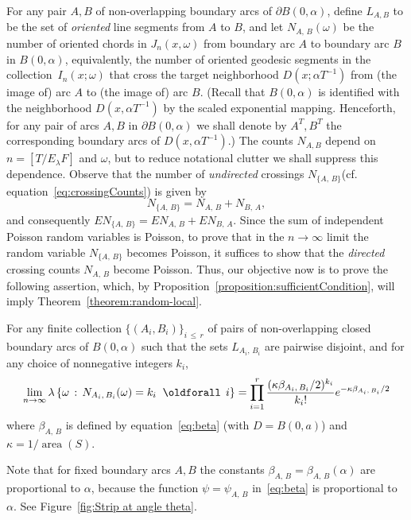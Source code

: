\documentclass[10pt]{amsart}
\theoremstyle{definition}\newtheorem{defi}[theo]{Definition}\newtheorem{rema}[theo]{Remark}\newtheorem{exam}[theo]{Example}\newtheorem{exem}[theo]{Example}\newtheorem{nota}[theo]{Notation}
\DeclareMathOperator{\area}{area}
\renewcommand*{\forall}{\mathrel{\oldforall}}
\begin{document}
For any pair $A,B$ of non-overlapping boundary arcs of $\partial B (0,\alpha)$, define $L_{A,B}$ to be the set of
\emph{oriented} line segments from $A$ to $B$, and let $N_{A,\,B} (\omega)$ be the number of oriented chords in $J_{n} (x,\omega)$ from boundary arc $A$ to boundary arc $B$ in $B(0,\alpha)$, equivalently, the number of oriented geodesic segments in the collection~$I_{n} (x;\omega)$ that cross the target neighborhood $D(x;\alpha T^{-1})$ from (the image of) arc $A$ to (the image of) arc $B$. (Recall that $B (0,\alpha)$ is identified with the neighborhood $D(x,\alpha T^{-1})$ by the scaled exponential mapping. Henceforth, for any pair of arcs $A,B$ in $\partial B(0, \alpha)$ we shall denote by $A^{T},B^{T}$ the corresponding boundary arcs of $D(x,\alpha T^{-1})$.) The counts $N_{A,B}$ depend on $n=[T/E_{\lambda}F]$ and $\omega$, but to reduce notational clutter we shall suppress this dependence. Observe that the number of \emph{undirected} crossings $N_{\{A,\,B \}}$(cf. equation~\eqref{eq:crossingCounts}) is given by
\[
N_{\{A,\,B \}}=N_{A,\,B}+N_{B,\,A},
\]
and consequently $EN_{\{A,\,B \}}=EN_{A,\,B}+EN_{B,\,A}$. Since the sum of independent Poisson random variables is Poisson, to prove that in the $n \rightarrow \infty$ limit the random variable $N_{\{A,\,B\}}$ becomes Poisson, it suffices to show that the \emph{directed} crossing counts $N_{A,\,B}$ become Poisson. Thus, our objective now is to prove the following assertion, which, by Proposition~\ref{proposition:sufficientCondition}, will imply Theorem~\ref{theorem:random-local}.

\begin{prop}\label{proposition:reformulation}
For any finite collection $\{(A_{i},B_{i}) \}_{i\,\leq \,r}$ of pairs of non-overlapping closed boundary arcs of $B (0,\alpha)$ such that the sets $L_{A_{i},\,B_{i}}$ are pairwise disjoint, and for any choice of nonnegative integers $k_{i}$,
\begin{equation}\label{eq:reformulation}
\lim_{n \rightarrow \infty} \lambda \left\{\omega \,:\, N_{A_{i},\,B_{i}} (\omega)=k_{i} \; \forall \,i \right\} =\prod_{i=1}^{r} \frac{(\kappa
\beta_{A_{i},\,B_{i}}/2)^{k_{i}}}{k_{i}!} e^{- \kappa \beta_{A_{i},\,B_{i}}/2}
\end{equation}
where $\beta_{A,\,B}$ is defined by equation~\eqref{eq:beta} (with $D=B(0,a)$) and $\kappa=1/\area(S)$.
\end{prop}

Note that for fixed boundary arcs $A,B$ the constants $\beta_{A,\,B}=\beta_{A,\,B}(\alpha)$ are proportional to $\alpha$, because the function $\psi =\psi_{A,\,B}$ in~\eqref{eq:beta} is proportional to $\alpha$. See Figure~\ref{fig:Strip at angle theta}.
\end{document}
